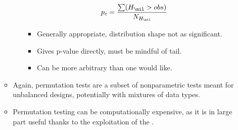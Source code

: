 \begin{itemize}
\begin{itemize}
\begin{itemize}
        \[%
        p_c = \frac{\sum(H_\nil > obs)}{N_{H_\nil}}
        \]%
        \begin{itemize}
          \item Generally appropriate, distribution shape not as significant.
          \item Gives p-value directly, must be mindful of tail. 
          \item Can be more arbitrary than one would like.
        \end{itemize}
      \end{itemize}
      \item Again, permutation tests are a subset of nonparametric tests meant for unbalanced designs, potentially with mixtures of data types.
      \item Permutation testing can be computationally expensive, as it is in large part useful thanks to the exploitation of the \hyperref[Subsection: Law of Large Numbers and Central Limit Theorem]{}. 
  \end{itemize}
  
\end{itemize}

